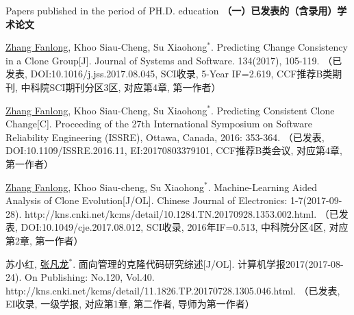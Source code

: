 
 {Papers
published in the period of PH.D. education}
\noindent\textbf{（一）已发表的（含录用）学术论文}
\begin{publist}

\item
\underline{Zhang Fanlong}, Khoo Siau-Cheng, Su Xiaohong{$^*$}. Predicting Change Consistency in a Clone Group[J]. Journal of Systems and Software. 134(2017), 105-119.
（已发表, DOI:10.1016/j.jss.2017.08.045, SCI收录,  5-Year IF=2.619, CCF推荐B类期刊, 中科院SCI期刊分区3区, 对应第4章, 第一作者）

\item
\underline{Zhang Fanlong}, Khoo Siau-Cheng, Su Xiaohong{$^*$}. Predicting Consistent Clone Change[C]. Proceeding of the 27th International Symposium on Software Reliability Engineering (ISSRE), Ottawa, Canada, 2016: 353-364.
（已发表, DOI:10.1109/ISSRE.2016.11, EI:20170803379101, CCF推荐B类会议, 对应第4章, 第一作者）

\item
\underline{Zhang Fanlong}, Khoo Siau-cheng, Su Xiaohong{$^*$}. Machine-Learning Aided Analysis of Clone Evolution[J/OL]. Chinese Journal of Electronics: 1-7(2017-09-28). http://kns.cnki.net/kcms/detail/10.1284.TN.20170928.1353.002.html.
（已发表, DOI:10.1049/cje.2017.08.012, SCI收录, 2016年IF=0.513, 中科院分区4区, 对应第2章, 第一作者）


\item
苏小红, \underline{张凡龙}{$^*$}. 面向管理的克隆代码研究综述[J/OL]. 计算机学报2017(2017-08-24). On Publishing: No.120, Vol.40. http://kns.cnki.net/kcms/detail/11.1826.TP.20170728.1305.046.html.
（已发表, EI收录, 一级学报, 对应第1章, 第二作者, 导师为第一作者）



\end{publist}
